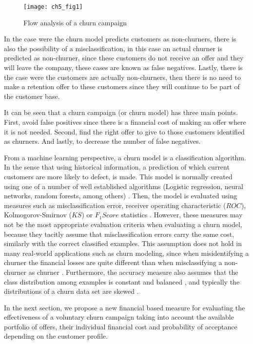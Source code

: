   \begin{figure}[t]
    \centering
    \texttt{[image: ch5\_fig1]}   %
    \caption{Flow analysis of a churn campaign \citep{Verbraken2012}}
    \label{fig:ch5:1}
  \end{figure}
  
In the case were the churn model predicts customers as non-churners, there is also the possibility 
of a misclassification, in this case an actual churner is predicted as non-churner, since 
these customers do not receive an offer and they will leave the company, these cases are known as 
false negatives. Lastly, there is the case were the customers are actually non-churners, then 
there is no need to make a retention offer to these customers since they will continue to be part 
of the customer base.

It can be seen that a churn campaign (or churn model) has three main points. First, avoid false 
positives since there is a financial cost of making an offer where it is not needed. Second, find 
the right offer to give to those customers identified as churners. And lastly, to decrease 
the number of false negatives.

From a machine learning perspective, a churn model is a classification algorithm.
In the sense that using historical information, a prediction of which current customers 
are more likely to defect, is made. This model is normally created using one of a number of 
well established algorithms (Logistic regression, neural networks, random forests, among 
others) \citep{Ngai2009,KhakAbi2010}. Then, the model is evaluated using measures such as 
misclassification error, receiver operating characteristic ($ROC$),  Kolmogorov-Smirnov ($KS$) 
or \mbox{$F_1Score$} statistics \citep{Verbeke2012}. 
However, these measures may not be the most appropriate evaluation criteria when  
evaluating a churn model, because they tacitly assume that misclassification errors carry the 
same cost, similarly with the correct classified examples. This assumption does not hold in many 
real-world applications such as churn modeling, since  when misidentifying a churner the financial 
losses are quite different than when misclassifying a non-churner as churner \citep{Glady2009}. 
Furthermore, the accuracy measure also assumes that the class distribution 
among examples is constant and balanced \citep{Provost1998}, and typically the distributions of a 
churn data set are skewed \citep{Verbeke2012}.
	
In the next section, we propose a new financial based measure for evaluating the effectiveness of 
a voluntary churn campaign taking into account the available portfolio of offers, their 
individual 	financial cost and probability of acceptance depending on the customer profile. 


